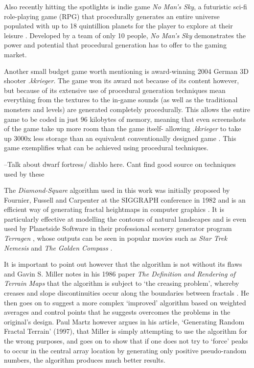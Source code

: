 \documentclass[12pt,a4paper]{article}
\begin{document}
Also recently hitting the spotlights is indie game \emph{No Man's Sky}, a futuristic sci-fi role-playing game (RPG) that procedurally generates an entire universe populated with up to 18 quintillion planets for the player to explore at their leisure \cite{E3}. Developed by a team of only 10 people, \emph{No Man's Sky} demonstrates the power and potential that procedural generation has to offer to the gaming market. 

Another small budget game worth mentioning is award-winning 2004 German 3D shooter \emph{.kkrieger}. The game won its award not because of its content however, but because of its extensive use of procedural generation techniques mean everything from the textures to the in-game sounds (as well as the traditional monsters and levels) are generated completely procedurally. This allows the entire game to be coded in just 96 kilobytes of memory, meaning that even screenshots of the game take up more room than the game itself- allowing \emph{.kkrieger} to take up 3000x less storage than an equivalent conventionally designed game \cite{kkrieger}. This game exemplifies what can be achieved using procedural techniques. 

--Talk about dwarf fortress/ diablo here. Cant find good source on techniques used by these

The \emph{Diamond-Square} algorithm used in this work was initially proposed by Fournier, Fussell and Carpenter at the SIGGRAPH conference in 1982 and is an efficient way of generating fractal heightmaps in computer graphics \cite{FournierDSq}. It is particularly effective at modelling the contours of natural landscapes and is even used by Planetside Software in their professional scenery generator program \emph{Terragen} \cite{claghorn}, whose outputs can be seen in popular movies such as \emph{Star Trek Nemesis} and \emph{The Golden Compass} \cite{planetside}. 

It is important to point out however that the algorithm is not without its flaws and Gavin S. Miller notes in his 1986 paper \emph{The Definition and Rendering of Terrain Maps} that the algorithm is subject to `the creasing problem', whereby creases and slope discontinuities occur along the boundaries between fractals \cite{GMillerDiamondSq}. He then goes on to suggest a more complex `improved' algorithm based on weighted averages and control points that he suggests overcomes the problems in the original's design. Paul Martz however argues in his article, `Generating Random Fractal Terrain' (1997), that Miller is simply attempting to use the algorithm for the wrong purposes, and goes on to show that if one does not try to `force' peaks to occur in the central array location by generating only positive pseudo-random numbers, the algorithm produces much better results. 
\end{document}

